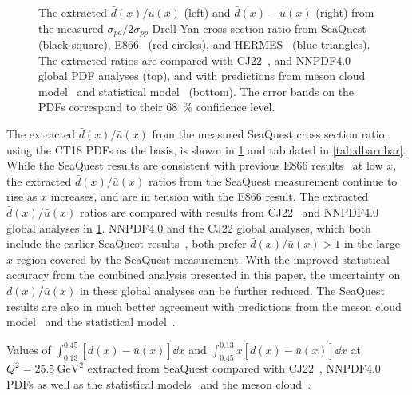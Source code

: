 \documentclass[reprint,aps,unsortedaddress,superscriptaddress,prl,floatfix,showpacs,linenumbers]{revtex4-2}
\begin{document}
\begin{figure}[htpb!]
\begin{subfigure}{0.45\linewidth}
	\end{subfigure}
	\caption{The extracted $\bar{d}(x)/\bar{u}(x)$ (left) and $\bar{d}(x)-\bar{u}(x)$ (right)
		from the measured $\sigma_{pd}/2\sigma_{pp}$ Drell-Yan cross section ratio
		from SeaQuest (black square), E866~\cite{towell2001} (red circles), and HERMES~\cite{ackerstaff1998} (blue triangles).
		The extracted ratios are compared with CJ22~\cite{accardi2023}, and NNPDF4.0~\cite{ball2022a} global PDF analyses (top),
		and with predictions from meson cloud model~\cite{alberg2022} and statistical model~\cite{soffer2019} (bottom).
		The error bands on the PDFs correspond to their \SI{68}{\percent} confidence level.
	}
	\label{fig:e906_e866_dbarubar}
\end{figure}

The extracted $\bar{d}(x)/\bar{u}(x)$ from the measured SeaQuest cross section ratio,
using the CT18 PDFs as the basis, is shown in \cref{fig:e906_e866_dbarubar}
and tabulated in \cref{tab:dbarubar}.
While the SeaQuest results are consistent with previous E866
results~\cite{towell2001} at low $x$,
the extracted $\bar{d}(x)/\bar{u}(x)$ ratios from the SeaQuest measurement
continue to rise as $x$ increases,
and are in tension with the E866 result.
The extracted $\bar{d}(x)/\bar{u}(x)$ ratios are compared with results
from CJ22~\cite{accardi2023} and NNPDF4.0~\cite{ball2022a}
global analyses in \cref{fig:e906_e866_dbarubar}.
NNPDF4.0 and the CJ22 global analyses, which both include the earlier SeaQuest results~\cite{dove2021},
both prefer $\bar{d}(x)/\bar{u}(x)>1$ in the large $x$ region covered by the SeaQuest measurement.
With the improved statistical accuracy from the combined analysis
presented in this paper, the uncertainty on $\bar{d}(x)/\bar{u}(x)$ in
these global analyses can be further reduced.
The SeaQuest results are also in much better agreement with
predictions from the meson cloud model~\cite{alberg2022}
and the statistical model~\cite{soffer2019}.

\begin{table}[htbp!]
	\centering
	\caption{Values of $\int^{0.45}_{0.13} \left[\bar{d}\left(x\right) - \bar{u}\left(x\right)\right] \dd{x}$
		and $\int_{0.45}^{0.13} x\left[\bar{d}\left(x\right) - \bar{u}\left(x\right)\right] \dd{x}$ at $Q^2=\SI{25.5}{\GeV\squared}$ extracted from
		SeaQuest compared with  CJ22~\cite{accardi2023}, NNPDF4.0~\cite{ball2022a}
		PDFs as well as the statistical models~\cite{soffer2019} and the meson cloud~\cite{alberg2022}.}
	\label{tab:dbarMubar}
	\begin{adjustbox}{max width=\linewidth}
		
	\end{adjustbox}
\end{table}
\end{document}
